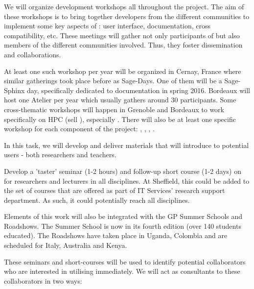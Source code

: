\begin{workpackage}
\begin{tasklist}
\begin{task}[title=Organization of development workshops]

We will organize development workshops all throughout the project. The aim of these workshops
is to bring together developers from the different communities to implement some key aspects of \TheProject: user interface, documentation, cross compatibility, etc. These meetings will gather not only participants of \TheProject but also members of the different communities involved. Thus, they foster dissemination and  collaborations.

At least one such workshop per year will be organized in Cernay, France where similar gatherings took place before as Sage-Days. One of them will be a Sage-Sphinx day, specifically dedicated to documentation in spring 2016. Bordeaux will host one Atelier \Pari per year which usually gathers around 30 participants. Some cross-thematic workshops will happen in Grenoble and Bordeaux to work specifically on HPC (sell ), especially . There will also be at least one specific workshop for each component of the project: \Singular, \SMC, \IPython, \Jupyter.


\end{task}

\begin{task}[title=Introduce \TheProject to researchers and teachers]


In this task, we will develop and deliver materials that will introduce \TheProject to potential users - both researchers and teachers.

Develop a 'taster' seminar (1-2 hours) and follow-up short course (1-2 days) on \TheProject for researchers and lecturers in all disciplines. At Sheffield, this could be added to the set of courses that are offered as part of IT Services' research support department. As such, it could potentially reach all disciplines.

Elements of this work will also be integrated with the GP Summer Schools and Roadshows. The Summer School is now in its fourth edition (over 140 students educated). The Roadshows have taken place in Uganda, Colombia and are scheduled for Italy, Australia and Kenya.

These seminars and short-courses will be used to identify potential collaborators who are interested in utilising \TheProject immediately. We will act as consultants to these collaborators in two ways:


\end{task}
\end{tasklist}
\end{workpackage}
